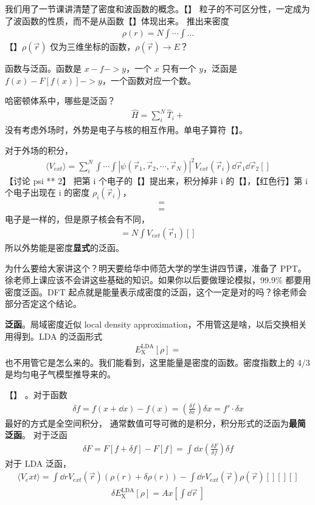 我们用了一节课讲清楚了密度和波函数的概念。【】
粒子的不可区分性，一定成为了波函数的性质，而不是从函数【】体现出来。
推出来密度
\begin{align}
    \rho (r) = N \int \cdots \int ...
\end{align}
【】$\rho(\vec r)$ 仅为三维坐标的函数，$\rho(\vec r)\rightarrow E$？

函数与泛函。函数是 $x -f-> y$，一个 $x$ 只有一个 $y$，泛函是 $f(x) -F[f(x)]-> y$，一个函数对应一个数。

哈密顿体系中，哪些是泛函？
\begin{align}
\hat H = \sum_i^N \hat T_i + 
\end{align}
没有考虑外场时，外势是电子与核的相互作用。单电子算符【】。

对于外场的积分，
\begin{align}
\langle V_{ext} \rangle = \sum_i^N \int \cdots \int |\psi(\vec r_1, \vec r_2, \cdots, \vec r_N)|^2 V_{ext}(\vec r_i) \dd \vec r_1 \dd \vec r_2 []
\end{align}
【讨论 psi ** 2】
把第 i 个电子的【】提出来，积分掉非 i 的【】，【红色行】第 i 个电子出现在 i 的密度 $\rho_i(\vec r_i)$，
\begin{align}
    &=\\
    &=
\end{align}
电子是一样的，但是原子核会有不同，
\begin{align}
    =N \int V_{ext} (\vec r_1) []
\end{align}
所以外势能是密度\textbf{显式}的泛函。

为什么要给大家讲这个？明天要给华中师范大学的学生讲四节课，准备了 PPT。徐老师上课应该不会讲这些基础的知识。如果你以后要做理论模拟，99.9\% 都要用密度泛函。DFT 起点就是能量表示成密度的泛函，这个一定是对的吗？徐老师会部分否定这个结论。

\textbf{泛函}。局域密度近似 local density approximation，不用管这是啥，以后交换相关用得到。LDA 的泛函形式
\begin{align}
E_{\text{X}}^{\text{LDA}}[\rho] = 
\end{align}
也不用管它是怎么来的。我们能看到，这里能量是密度的函数。密度指数上的 4/3 是均匀电子气模型推导来的。

【】
。对于函数
\begin{align}
    \delta f = f(x+\dd x) - f(x) = \left(\frac{\delta f}{\delta x}\right)\delta x = f' \cdot \delta x
\end{align}
最好的方式是全空间积分，
通常数值可导可微的是积分，积分形式的泛函为\textbf{最简泛函}。
对于泛函
\begin{align}
    \delta F = F[f + \delta f] - F[f] = \int \dd x \left(\frac{\delta F}{\delta f}\right) \delta f
\end{align}
对于 LDA 泛函，
\begin{align}
\langle V_ext \rangle = \int \dd r V_{ext} (\vec r) (\rho(r) + \delta \rho(r) ) - \int \dd r V_{ext} (\vec r) \rho(\vec r) [][][]
\end{align}
\begin{align}
\delta E_{\text{X}}^{\text{LDA}}[\rho] = Ax \left[
    \int \dd\vec r \
\right]
\end{align}

